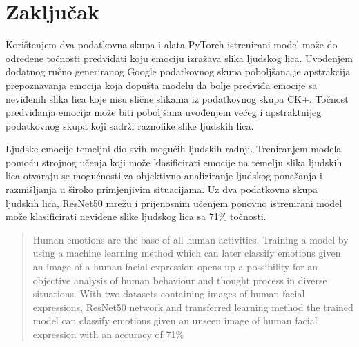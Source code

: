 \documentclass[times, utf8, zavrsni,numeric,pstricks]{fer}
\begin{document}
\chapter{Zaključak}
Korištenjem dva podatkovna skupa i alata PyTorch istrenirani model može do određene točnosti predviđati koju emociju izražava slika ljudskog lica. Uvođenjem dodatnog ručno generiranog Google podatkovnog skupa poboljšana je apstrakcija prepoznavanja emocija koja dopušta modelu da bolje predviđa emocije sa neviđenih slika lica koje nisu slične slikama iz podatkovnog skupa CK+. Točnost predviđanja emocija može biti poboljšana uvođenjem većeg i apstraktnijeg podatkovnog skupa koji sadrži raznolike slike ljudskih lica. 






\begin{sazetak}
Ljudske emocije temeljni dio svih mogućih ljudskih radnji. Treniranjem modela pomoću strojnog učenja koji može klasificirati emocije na temelju slika ljudskih lica otvaraju se mogućnosti za objektivno analiziranje ljudskog ponašanja i razmišljanja u široko primjenjivim situacijama. Uz dva podatkovna skupa ljudskih lica, ResNet50 mrežu i prijenosnim učenjem ponovno istrenirani model može klasificirati neviđene slike ljudskog lica sa 71\% točnosti.

\end{sazetak}

\begin{abstract}
Human emotions are the base of all human activities. Training a model 
by using a machine learning method which can later classify emotions given an image of a human facial expression opens up a possibility for an objective analysis of human behaviour and thought process in diverse situations. With two datasets containing images of human facial expressions, ResNet50 network and transferred learning method the trained model can classify emotions given an unseen image of human facial expression with an accuracy of 71\%

\end{abstract}
\end{document}
